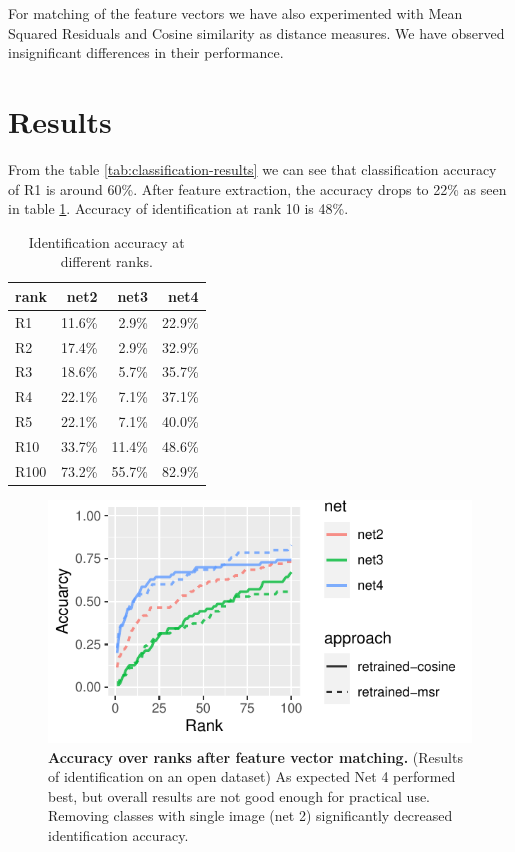 \documentclass[fleqn,moreauthors,10pt]{ds_report}
\begin{document}
For matching of the feature vectors we have also experimented with Mean Squared Residuals and Cosine similarity as distance measures. We have observed insignificant differences in their performance.


\newpage
\section*{Results}

From the table \ref{tab:classification-results} we can see that classification accuracy of R1 is around 60\%. After feature extraction, the accuracy drops to 22\% as seen in table \ref{tab:identification-results}. Accuracy of identification at rank 10 is 48\%.

\begin{table}[hbt]
	\caption{Identification accuracy at different ranks.}
	\centering
	\begin{tabular}{l r r r}
		\toprule
		rank & net2    & net3    & net4   \\
		\midrule
		R1   & 11.6\%  &  2.9\%  & 22.9\% \\
		R2   & 17.4\%  &  2.9\%  & 32.9\% \\
		R3   & 18.6\%  &  5.7\%  & 35.7\% \\
		R4   & 22.1\%  &  7.1\%  & 37.1\% \\
		R5   & 22.1\%  &  7.1\%  & 40.0\% \\
		R10  & 33.7\%  & 11.4\%  & 48.6\% \\
		R100 & 73.2\%  & 55.7\%  & 82.9\% \\
		\bottomrule
	\end{tabular}
	\label{tab:identification-results}
\end{table}

\begin{figure}[htb]\centering
	\includegraphics[width=\linewidth]{ranks-ident-nets.pdf}
	\caption{\textbf{Accuracy over ranks after feature vector matching.} (Results of identification on an open dataset) As expected Net 4 performed best, but overall results are not good enough for practical use. Removing classes with single image (net 2) significantly decreased identification accuracy.}
	\label{fig:ranks-ident-nets}
\end{figure}
\end{document}
